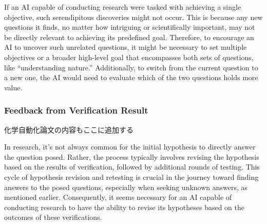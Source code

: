 If an AI capable of conducting research were tasked with achieving a single objective, such serendipitous discoveries might not occur. This is because any new questions it finds, no matter how intriguing or scientifically important, may not be directly relevant to achieving its predefined goal. Therefore, to encourage an AI to uncover such unrelated questions, it might be necessary to set multiple objectives or a broader high-level goal that encompasses both sets of questions, like ``understanding nature.'' Additionally, to switch from the current question to a new one, the AI would need to evaluate which of the two questions holds more value.



\subsubsection{Feedback from Verification Result}
化学自動化論文の内容もここに追加する

In research, it's not always common for the initial hypothesis to directly answer the question posed. Rather, the process typically involves revising the hypothesis based on the results of verification, followed by additional rounds of testing. This cycle of hypothesis revision and retesting is crucial in the journey toward finding answers to the posed questions, especially when seeking unknown answers, as mentioned earlier. Consequently, it seems necessary for an AI capable of conducting research to have the ability to revise its hypotheses based on the outcomes of these verifications.

